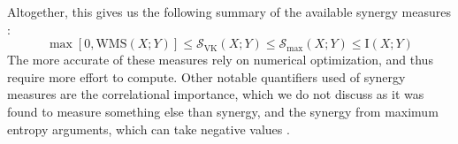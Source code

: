 \documentclass[../main.tex]{subfiles}
\begin{document}
Altogether, this gives us the following summary of the available synergy measures \cite{griffith2014quantifying}:
%
\begin{equation}
\max [0,\mathrm{WMS}\left( X;Y \right)] \le \mathcal{S}_\mathrm{VK} \left( X;Y \right) \le \mathcal{S}_\mathrm{max} \left( X;Y \right) \le \mathrm{I}\left( X;Y \right)
\end{equation}
%
The more accurate of these measures rely on numerical optimization, and thus require more effort to compute.
Other notable quantifiers used of synergy measures are the correlational importance, which we do not discuss as it was found to measure something else than synergy, and the synergy from maximum entropy arguments, which can take negative values \cite{griffith2014quantifying, olbrich2015information}.
\end{document}
